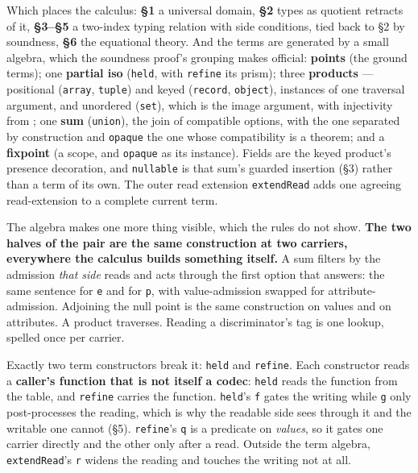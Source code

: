 Which places the calculus: \textbf{§1} a universal domain, \textbf{§2} types as quotient retracts of it,
\textbf{§3–§5} a two-index typing relation with side conditions, tied back to §2 by soundness, \textbf{§6} the
equational theory. And the terms are generated by a small algebra, which the soundness proof's
grouping makes official: \textbf{points} (the ground terms); one \textbf{partial iso} (\texttt{held}, with \texttt{refine}
its prism); three \textbf{products} — positional (\texttt{array},
\texttt{tuple}) and keyed (\texttt{record}, \texttt{object}), instances of one traversal argument, and unordered (\texttt{set}),
which is the image argument, with injectivity from ;
one \textbf{sum} (\texttt{union}), the join of compatible options, with  the one separated
by construction and \texttt{opaque} the one whose compatibility is a theorem; and a \textbf{fixpoint} (a scope,
and \texttt{opaque} as its instance). Fields are the keyed product's
presence decoration, and \texttt{nullable} is that sum's guarded insertion (§3) rather than a term of its own.
The outer read extension \texttt{extendRead} adds one agreeing read-extension to a complete current term.

The algebra makes one more thing visible, which the rules do not show. \textbf{The two halves of the pair are the same construction at two carriers, everywhere the
calculus builds something itself.} A sum filters by the admission \emph{that side} reads and acts
through the first option that answers: the same sentence for \texttt{e} and for \texttt{p}, with value-admission
swapped for attribute-admission. Adjoining the null point is the same construction on values and on
attributes. A product traverses. Reading a discriminator's tag is one lookup, spelled once per
carrier.

Exactly two term constructors break it: \texttt{held} and \texttt{refine}. Each
constructor reads a \textbf{caller's function that is not itself a codec}: \texttt{held} reads the
function from the table, and \texttt{refine} carries the function. \texttt{held}'s \texttt{f}
gates the writing while \texttt{g} only post-processes the reading, which is why the readable side sees
through it and the writable one cannot (§5). \texttt{refine}'s
\texttt{q} is a predicate on \emph{values}, so it gates one carrier directly and the other only after a read.
Outside the term algebra, \texttt{extendRead}'s \texttt{r} widens the reading and
touches the writing not at all.

